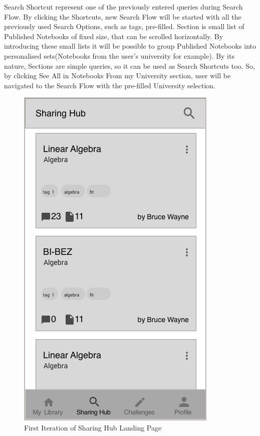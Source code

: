 \documentclass[thesis=B,english]{FITthesis}[2012/10/20]
\begin{document}
Search Shortcut represent one of the previously entered queries during Search Flow. By clicking the Shortcuts, new Search Flow will be started with all the previously used Search Options, such as tags, pre-filled.
Section is small list of Published Notebooks of fixed size, that can be scrolled horizontally. By introducing these small lists it will be possible to group Published Notebooks into personalised sets(Notebooks from the user's university for example). By its nature, Sections are simple queries, so it can be used as Search Shortcuts too. So, by clicking See All in Notebooks From my University section, user will be navigated to the Search Flow with the  pre-filled University selection.


\begin{figure}[H]
\centering
  \includegraphics[scale=0.5]{SharingHub}
  \caption{First Iteration of Sharing Hub Landing Page}
  \label{fig:section-sharinghubv1}
\end{figure}
\end{document}
